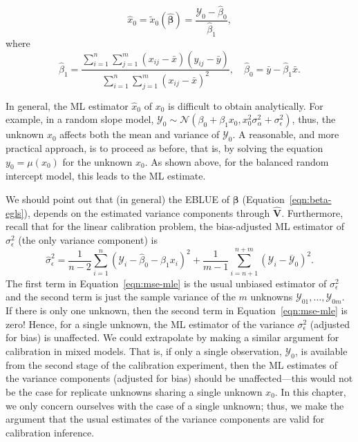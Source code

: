 \documentclass[cmfont,usenames,dvipsnames,leqno]{afit-etd}\usepackage[]{graphicx}\usepackage[]{color}
\newcommand{\mc}[1]{\ensuremath{\mathcal{#1}}}
\newcommand{\wh}[1]{\ensuremath{\widehat{#1}}}
\begin{document}
\begin{equation*}
  \wh{x}_0 = \widetilde{x}_0\left(\wh{\bm{\beta}}\right) = \frac{\mc{Y}_0 - \wh{\beta}_0}{\wh{\beta}_1},
\end{equation*}
where 
\begin{equation*}
  \wh{\beta}_1 = \frac{\sum_{i=1}^n\sum_{j=1}^m\left(x_{ij}-\bar{x}\right)\left(y_{ij}-\bar{y}\right)}{\sum_{i=1}^n\sum_{j=1}^m\left(x_{ij}-\bar{x}\right)^2}, \quad \wh{\beta}_0 = \bar{y} - \wh{\beta}_1\bar{x}.
\end{equation*}

In general, the ML estimator $\wh{x}_0$ of $x_0$ is difficult to obtain analytically. For example, in a random slope model, $\mc{Y}_0 \sim \mc{N}\left(\beta_0 + \beta_1 x_0, x_0^2\sigma_\alpha^2 + \sigma_\epsilon^2\right)$, thus, the unknown $x_0$ affects both the mean and variance of $\mc{Y}_0$. A reasonable, and more practical approach, is to proceed as before, that is, by solving the equation $y_0 = \mu(x_0)$ for the unknown $x_0$. As shown above, for the balanced random intercept model, this leads to the ML estimate.

We should point out that (in general) the EBLUE of $\bm{\beta}$ (Equation~\eqref{eqn:beta-egls}), depends on the estimated variance components through $\wh{\bm{V}}$. Furthermore, recall that for the linear calibration problem, the bias-adjusted ML estimator of $\sigma_\epsilon^2$ (the only variance component) is 
\begin{equation}
\label{eqn:mse-mle}
  \wh{\sigma}_\epsilon^2 = \frac{1}{n-2}\sum_{i=1}^n(\mc{Y}_i-\wh{\beta}_0-\wh{\beta}_1 x_i)^2 + \frac{1}{m-1}\sum_{i=n+1}^{n+m}(\mc{Y}_i-\overline{\mc{Y}}_0)^2.
\end{equation}
The first term in Equation~\eqref{eqn:mse-mle} is the usual unbiased estimator of $\sigma_\epsilon^2$ and the second term is just the sample variance of the $m$ unknowns $\mc{Y}_{01}, \dotsc, \mc{Y}_{0m}$. If there is only one unknown, then the second term in Equation~\eqref{eqn:mse-mle} is zero! Hence, for a single unknown, the ML estimator of the variance $\sigma_\epsilon^2$ (adjusted for bias) is unaffected. We could extrapolate by making a similar argument for calibration in mixed models. That is, if only a single observation, $\mc{Y}_0$, is available from the second stage of the calibration experiment, then the ML estimates of the variance components (adjusted for bias) should be unaffected---this would not be the case for replicate unknowns sharing a single unknown $x_0$. In this chapter, we only concern ourselves with the case of a single unknown; thus, we make the argument that the usual estimates of the variance components are valid for calibration inference. 
\end{document}
